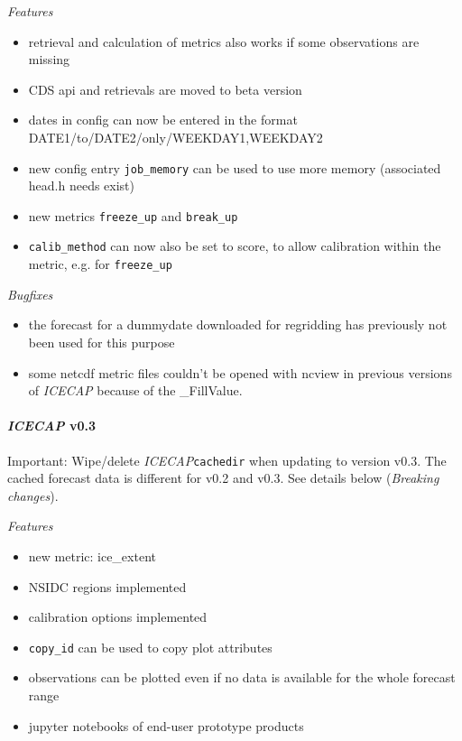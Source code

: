 \documentclass[DIV=10, parskip=full]{scrreprt}
\newcommand{\ice}{\textit{ICECAP}\xspace}
\begin{document}
\textit{Features}
\begin{itemize}
	\item retrieval and calculation of metrics also works if some observations are missing
	\item CDS api and retrievals are moved to beta version
	\item dates in config can now be entered in the format DATE1/to/DATE2/only/WEEKDAY1,WEEKDAY2
	\item new config entry \texttt{job\_memory} can be used to use more memory (associated head.h needs exist)
	\item new metrics \texttt{freeze\_up} and \texttt{break\_up}
	\item \texttt{calib\_method} can now also be set to score, to allow calibration within the metric, e.g. for \texttt{freeze\_up}
\end{itemize}

\textit{Bugfixes}
\begin{itemize}
	\item the forecast for a dummydate downloaded for regridding has previously not been used for this purpose
	\item some netcdf metric files couldn't be opened with ncview in previous versions of \ice because of the \_FillValue. 
\end{itemize}

\paragraph{\textbf{\ice v0.3\\[5pt]}}

Important: Wipe/delete \ice \texttt{cachedir} when updating to version v0.3. The cached forecast data is different for v0.2 and v0.3. See details below (\textit{Breaking changes}).

\textit{Features}
\begin{itemize}
	\item new metric: ice\_extent
	\item NSIDC regions implemented
	\item calibration options implemented
	\item \texttt{copy\_id} can be used to copy plot attributes
	\item observations can be plotted even if no data is available for the whole forecast range
	\item jupyter notebooks of end-user prototype products
\end{itemize}
\end{document}
